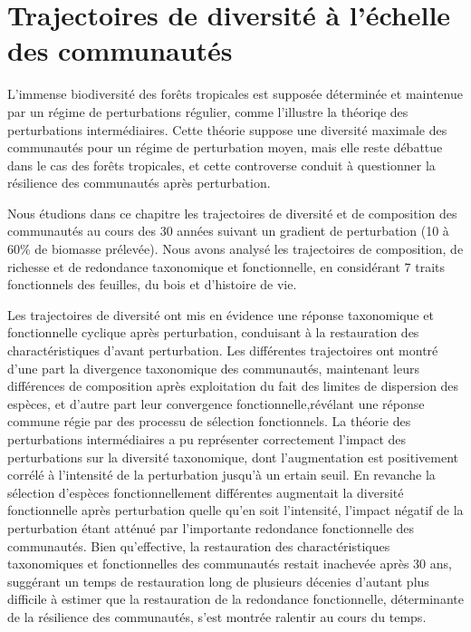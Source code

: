 \documentclass[
  11pt,
  french,
  A4paper,
  extrafontsizes,onecolumn,openright
  ]{memoir}
\begin{document}
\chapter{Trajectoires de diversité à l'échelle des
communautés}\label{trajectoires-de-diversite-a-lechelle-des-communautes}

L'immense biodiversité des forêts tropicales est supposée déterminée et
maintenue par un régime de perturbations régulier, comme l'illustre la
théoriqe des perturbations intermédiaires. Cette théorie suppose une
diversité maximale des communautés pour un régime de perturbation moyen,
mais elle reste débattue dans le cas des forêts tropicales, et cette
controverse conduit à questionner la résilience des communautés après
perturbation.

Nous étudions dans ce chapitre les trajectoires de diversité et de
composition des communautés au cours des 30 années suivant un gradient
de perturbation (10 à 60\% de biomasse prélevée). Nous avons analysé les
trajectoires de composition, de richesse et de redondance taxonomique et
fonctionnelle, en considérant 7 traits fonctionnels des feuilles, du
bois et d'histoire de vie.

Les trajectoires de diversité ont mis en évidence une réponse
taxonomique et fonctionnelle cyclique après perturbation, conduisant à
la restauration des charactéristiques d'avant perturbation. Les
différentes trajectoires ont montré d'une part la divergence taxonomique
des communautés, maintenant leurs différences de composition après
exploitation du fait des limites de dispersion des espèces, et d'autre
part leur convergence fonctionnelle,révélant une réponse commune régie
par des processu de sélection fonctionnels. La théorie des perturbations
intermédiaires a pu représenter correctement l'impact des perturbations
sur la diversité taxonomique, dont l'augmentation est positivement
corrélé à l'intensité de la perturbation jusqu'à un ertain seuil. En
revanche la sélection d'espèces fonctionnellement différentes augmentait
la diversité fonctionnelle après perturbation quelle qu'en soit
l'intensité, l'impact négatif de la perturbation étant atténué par
l'importante redondance fonctionnelle des communautés. Bien
qu'effective, la restauration des charactéristiques taxonomiques et
fonctionnelles des communautés restait inachevée après 30 ans, suggérant
un temps de restauration long de plusieurs décenies d'autant plus
difficile à estimer que la restauration de la redondance fonctionnelle,
déterminante de la résilience des communautés, s'est montrée ralentir au
cours du temps.
\end{document}
